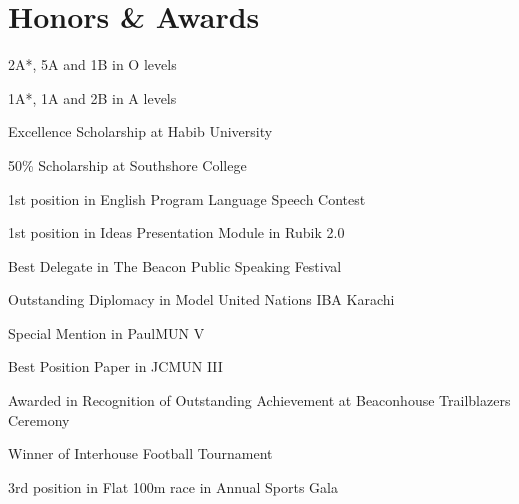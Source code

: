 \documentclass[]{deedy-resume-openfont}
\begin{document}
\section{Honors \& Awards}
\vspace{4pt}
\begin{tightemize}
\item 2A*, 5A and 1B in O levels\\
\item 1A*, 1A and 2B in A levels\\
\item Excellence Scholarship at Habib University\\
\item 50\% Scholarship at Southshore College\\
\item 1st position in English Program Language Speech Contest\\
\item 1st position in Ideas Presentation Module in Rubik 2.0\\
\item Best Delegate in The Beacon Public Speaking Festival\\
\item Outstanding Diplomacy in Model United Nations IBA Karachi\\
\item Special Mention in PaulMUN V\\
\item Best Position Paper in JCMUN III\\
\item Awarded in Recognition of Outstanding Achievement at Beaconhouse Trailblazers Ceremony\\
\item Winner of Interhouse Football Tournament\\
\item 3rd position in Flat 100m race in Annual Sports Gala\\
\end{tightemize}
      \ 
      
\end{document}
